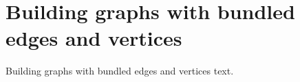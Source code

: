 \chapter{Building graphs with bundled edges and vertices}

Building graphs with bundled edges and vertices text.
